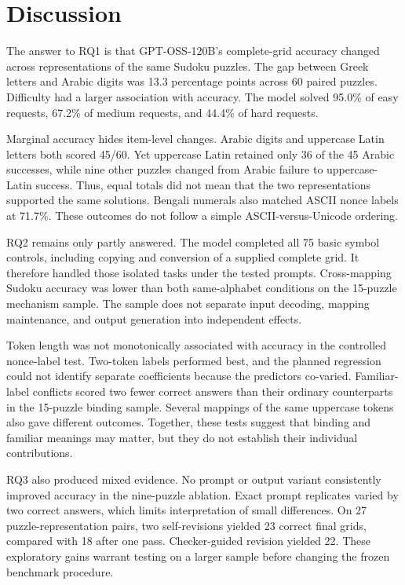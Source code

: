 \documentclass[11pt,a4paper]{article}
\begin{document}
\section{Discussion}
The answer to RQ1 is that GPT-OSS-120B's complete-grid accuracy changed across representations of the same Sudoku puzzles. The gap between Greek letters and Arabic digits was 13.3 percentage points across 60 paired puzzles. Difficulty had a larger association with accuracy. The model solved 95.0\% of easy requests, 67.2\% of medium requests, and 44.4\% of hard requests.

Marginal accuracy hides item-level changes. Arabic digits and uppercase Latin letters both scored 45/60. Yet uppercase Latin retained only 36 of the 45 Arabic successes, while nine other puzzles changed from Arabic failure to uppercase-Latin success. Thus, equal totals did not mean that the two representations supported the same solutions. Bengali numerals also matched ASCII nonce labels at 71.7\%. These outcomes do not follow a simple ASCII-versus-Unicode ordering.

RQ2 remains only partly answered. The model completed all 75 basic symbol controls, including copying and conversion of a supplied complete grid. It therefore handled those isolated tasks under the tested prompts. Cross-mapping Sudoku accuracy was lower than both same-alphabet conditions on the 15-puzzle mechanism sample. The sample does not separate input decoding, mapping maintenance, and output generation into independent effects.

Token length was not monotonically associated with accuracy in the controlled nonce-label test. Two-token labels performed best, and the planned regression could not identify separate coefficients because the predictors co-varied. Familiar-label conflicts scored two fewer correct answers than their ordinary counterparts in the 15-puzzle binding sample. Several mappings of the same uppercase tokens also gave different outcomes. Together, these tests suggest that binding and familiar meanings may matter, but they do not establish their individual contributions.

RQ3 also produced mixed evidence. No prompt or output variant consistently improved accuracy in the nine-puzzle ablation. Exact prompt replicates varied by two correct answers, which limits interpretation of small differences. On 27 puzzle-representation pairs, two self-revisions yielded 23 correct final grids, compared with 18 after one pass. Checker-guided revision yielded 22. These exploratory gains warrant testing on a larger sample before changing the frozen benchmark procedure.
\end{document}
